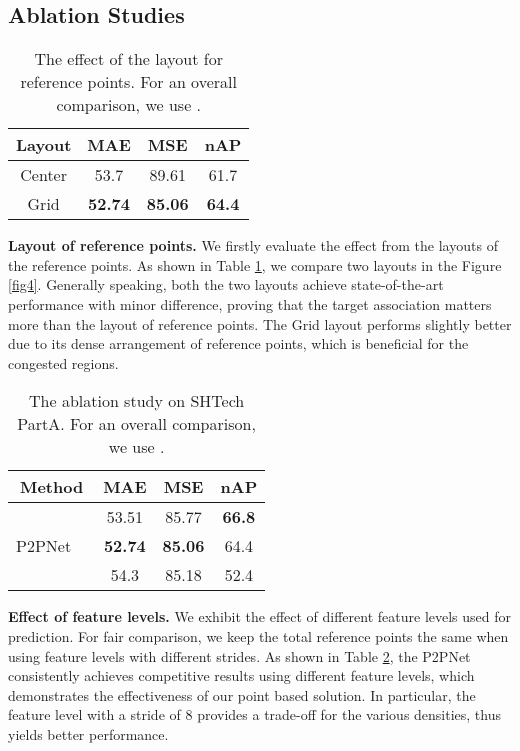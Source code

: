 \documentclass[10pt,twocolumn,letterpaper]{article}
\begin{document}
\subsection{Ablation Studies}
\begin{table}[!ht]
\vspace{-1.0em}
  \centering
  \begin{tabular}{c|c c c}
    \toprule[1pt]
    Layout & MAE & MSE & nAP\\
    \hline
    Center &  53.7 & 89.61 & 61.7\\
    \hline
    Grid &   \textbf{52.74} &  \textbf{85.06}  & \textbf{64.4}  \\
    \bottomrule[1pt]
  \end{tabular}
  \caption{The effect of the layout for reference points. For an overall comparison, we use .}\label{tab:anchor}
    \vspace{-1.5em}
\end{table}
\noindent \textbf{Layout of reference points.} We firstly evaluate the effect from the layouts of the reference points. As shown in Table \ref{tab:anchor}, we compare two layouts in the Figure \ref{fig4}. Generally speaking, both the two layouts achieve state-of-the-art performance with minor difference, proving that the target association matters more than the layout of reference points. The Grid layout performs slightly better due to its dense arrangement of reference points, which is beneficial for the congested regions.
\begin{table}[!ht]
  \centering
  \vspace{-0.5em}
  \begin{tabular}{c|c|c c c}
    \toprule[1pt]
    \multicolumn{2}{c|}{Method} & MAE & MSE & nAP\\
    \hline
    \multirow{3}{*}{P2PNet} &  & 53.51 & 85.77 & \textbf{66.8} \\
                               &  & \textbf{52.74} &  \textbf{85.06} & 64.4\\
                               &  & 54.3  &  85.18 & 52.4 \\
    \bottomrule[1pt]
  \end{tabular}
  \caption{The ablation study on SHTech PartA. For an overall comparison, we use .}\label{tab:strides}
    \vspace{-1.5em}
\end{table}

\noindent \textbf{Effect of feature levels.} We exhibit the effect of different feature levels used for prediction. For fair comparison, we keep the total reference points the same when using feature levels with different strides. As shown in Table \ref{tab:strides}, the P2PNet consistently achieves competitive results using different feature levels, which demonstrates the effectiveness of our point based solution. In particular, the feature level with a stride of 8 provides a trade-off for the various densities, thus yields better performance.
\end{document}
